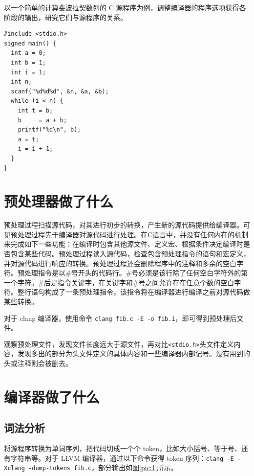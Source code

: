 \documentclass[UTF8,a4paper,10pt]{ctexart}
\begin{document}
以一个简单的计算斐波拉契数列的 C 源程序为例，调整编译器的程序选项获得各阶段的输出，研究它们与源程序的关系。

\begin{verbatim}
#include <stdio.h>
signed main() {
  int a = 0;
  int b = 1;
  int i = 1;
  int n;
  scanf("%d%d%d", &n, &a, &b);
  while (i < n) {
    int t = b;
    b     = a + b;
    printf("%d\n", b);
    a = t;
    i = i + 1;
  }
}
\end{verbatim}

\section{预处理器做了什么}
预处理过程扫描源代码，对其进行初步的转换，产生新的源代码提供给编译器。可见预处理过程先于编译器对源代码进行处理。在C语言中，并没有任何内在的机制来完成如下一些功能：在编译时包含其他源文件、定义宏、根据条件决定编译时是否包含某些代码。预处理过程读入源代码，检查包含预处理指令的语句和宏定义，并对源代码进行响应的转换。预处理过程还会删除程序中的注释和多余的空白字符。预处理指令是以\#号开头的代码行。\#号必须是该行除了任何空白字符外的第一个字符。\#后是指令关键字，在关键字和\#号之间允许存在任意个数的空白字符。整行语句构成了一条预处理指令，该指令将在编译器进行编译之前对源代码做某些转换。

对于 clang 编译器，使用命令 \verb|clang fib.c -E -o fib.i|，即可得到预处理后文件。

观察预处理文件，发现文件长度远大于源文件，再对比\verb|<stdio.h>|头文件定义内容，发现多出的部分为头文件定义的具体内容和一些编译器内部记号。没有用到的头或注释则会被删去。

\section{编译器做了什么}
\subsection{词法分析}
将源程序转换为单词序列，把代码切成一个个 token，比如大小括号、等于号、还有字符串等。对于 LLVM 编译器，通过以下命令获得 token 序列：\verb|clang -E -Xclang -dump-tokens fib.c|，部分输出如图\ref{pic:1}所示。
\end{document}
